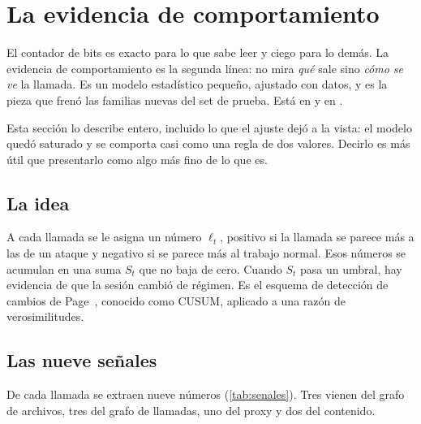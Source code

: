 \section{La evidencia de comportamiento}\label{sec:evidencia}

El contador de bits es exacto para lo que sabe leer y ciego para lo demás. La evidencia de
comportamiento es la segunda línea: no mira \emph{qué} sale sino \emph{cómo se ve} la llamada. Es un
modelo estadístico pequeño, ajustado con datos, y es la pieza que frenó las familias nuevas del set de
prueba. Está en  y en .

Esta sección lo describe entero, incluido lo que el ajuste dejó a la vista: el modelo quedó saturado y
se comporta casi como una regla de dos valores. Decirlo es más útil que presentarlo como algo más fino
de lo que es.

\subsection{La idea}

A cada llamada se le asigna un número $\ell_t$, positivo si la llamada se parece más a las de un
ataque y negativo si se parece más al trabajo normal. Esos números se acumulan en una suma $S_t$ que
no baja de cero. Cuando $S_t$ pasa un umbral, hay evidencia de que la sesión cambió de régimen. Es el
esquema de detección de cambios de Page~\cite{page}, conocido como CUSUM, aplicado a una razón de
verosimilitudes.

\subsection{Las nueve señales}

De cada llamada se extraen nueve números (\cref{tab:senales}). Tres vienen del grafo de archivos,
tres del grafo de llamadas, uno del proxy y dos del contenido.

